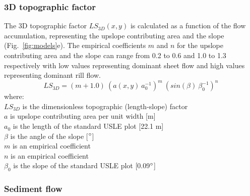 \documentclass[gmd, manuscript]{copernicus}
\begin{document}

\subsubsection{3D topographic factor}
%
The 3D topographic factor $LS_{3D}(x,y)$
is calculated as a function of 
the flow accumulation,
representing the upslope contributing area
and the slope 
(Fig.~\ref{fig:models}e). 
%
The empirical coefficients $m$ and $n$
for the upslope contributing area 
and the slope
can range from 0.2 to 0.6
and 1.0 to 1.3 respectively
with low values representing dominant sheet flow
and high values representing dominant rill flow.
%
\begin{equation}
\label{eq:ls_factor}
{LS_{3D} = (m+1.0) ~ (a(x,y) ~ a_0^{-1})^{m} ~ (sin(\beta) ~ \beta_0^{-1})^{n}}
\end{equation}
%
{\small
\noindent
where: \\
\noindent
\hspace*{0.5em} $LS_{3D}$ is the dimensionless topographic (length-slope) factor\\
\hspace*{0.5em} $a$ is upslope contributing area per unit width [\unit{m}]\\
\hspace*{0.5em} $a_0$ is the length of the standard USLE plot [22.1 \unit{m}]\\
\hspace*{0.5em} $\beta$ is the angle of the slope [$^{\circ}$]\\
\hspace*{0.5em} $m$ is an empirical coefficient\\
\hspace*{0.5em} $n$ is an empirical coefficient\\
\hspace*{0.5em} $\beta_0$ is the slope of the standard USLE plot [0.09$^{\circ}$]\\
}


\subsubsection{Sediment flow}
\end{document}
